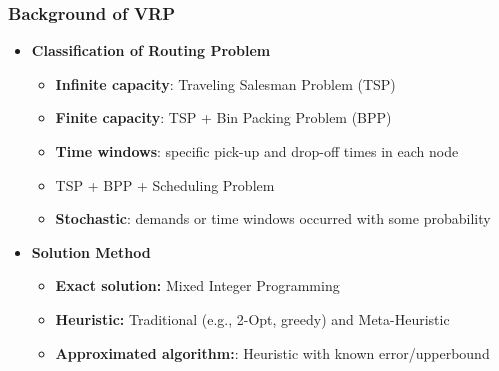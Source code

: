 \documentclass[10pt,handout,notes=show]{beamer}
\begin{document}
  \begin{frame}
  \frametitle{Background of VRP  \forIE}

  \begin{itemize}
    \item<1-> \textbf{Classification of Routing Problem}
    \begin{itemize}
      \item<2-> \textbf{Infinite capacity}: Traveling Salesman Problem (TSP)
      \item<2-> \textbf{Finite capacity}: TSP + Bin Packing Problem (BPP)
      \item<2-> \textbf{Time windows}: specific pick-up and drop-off times in each node
      \item<2->[] \hskip30pt TSP + BPP + Scheduling Problem
      \item<2-> \textbf{Stochastic}: demands or time windows occurred with some probability \NextLine
    \end{itemize}
    \item<1-> \textbf{Solution Method}
    \begin{itemize}
      \item<3-> \textbf{Exact solution:} Mixed Integer Programming
      \item<3-> \textbf{Heuristic:} \alert{Traditional} (e.g., 2-Opt, greedy) and \alert{Meta-Heuristic}
      \item<3-> \textbf{Approximated algorithm:}: Heuristic with known error/upperbound
    \end{itemize}
  \end{itemize}



  \end{frame}
\end{document}
